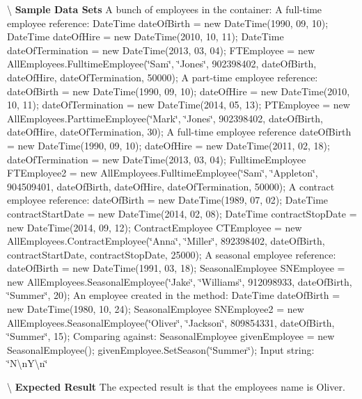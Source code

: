 \textbackslash{} {\bfseries  Sample Data Sets} A bunch of employees in the container\+: A full-\/time employee reference\+: Date\+Time date\+Of\+Birth = new Date\+Time(1990, 09, 10); Date\+Time date\+Of\+Hire = new Date\+Time(2010, 10, 11); Date\+Time date\+Of\+Termination = new Date\+Time(2013, 03, 04); F\+T\+Employee = new All\+Employees.\+Fulltime\+Employee(\char`\"{}\+Sam\char`\"{}, \char`\"{}\+Jones\char`\"{}, 902398402, date\+Of\+Birth, date\+Of\+Hire, date\+Of\+Termination, 50000); A part-\/time employee reference\+: date\+Of\+Birth = new Date\+Time(1990, 09, 10); date\+Of\+Hire = new Date\+Time(2010, 10, 11); date\+Of\+Termination = new Date\+Time(2014, 05, 13); P\+T\+Employee = new All\+Employees.\+Parttime\+Employee(\char`\"{}\+Mark\char`\"{}, \char`\"{}\+Jones\char`\"{}, 902398402, date\+Of\+Birth, date\+Of\+Hire, date\+Of\+Termination, 30); A full-\/time employee reference date\+Of\+Birth = new Date\+Time(1990, 09, 10); date\+Of\+Hire = new Date\+Time(2011, 02, 18); date\+Of\+Termination = new Date\+Time(2013, 03, 04); Fulltime\+Employee F\+T\+Employee2 = new All\+Employees.\+Fulltime\+Employee(\char`\"{}\+Sam\char`\"{}, \char`\"{}\+Appleton\char`\"{}, 904509401, date\+Of\+Birth, date\+Of\+Hire, date\+Of\+Termination, 50000); A contract employee reference\+: date\+Of\+Birth = new Date\+Time(1989, 07, 02); Date\+Time contract\+Start\+Date = new Date\+Time(2014, 02, 08); Date\+Time contract\+Stop\+Date = new Date\+Time(2014, 09, 12); Contract\+Employee C\+T\+Employee = new All\+Employees.\+Contract\+Employee(\char`\"{}\+Anna\char`\"{}, \char`\"{}\+Miller\char`\"{}, 892398402, date\+Of\+Birth, contract\+Start\+Date, contract\+Stop\+Date, 25000); A seasonal employee reference\+: date\+Of\+Birth = new Date\+Time(1991, 03, 18); Seasonal\+Employee S\+N\+Employee = new All\+Employees.\+Seasonal\+Employee(\char`\"{}\+Jake\char`\"{}, \char`\"{}\+Williams\char`\"{}, 912098933, date\+Of\+Birth, \char`\"{}\+Summer\char`\"{}, 20); An employee created in the method\+: Date\+Time date\+Of\+Birth = new Date\+Time(1980, 10, 24); Seasonal\+Employee S\+N\+Employee2 = new All\+Employees.\+Seasonal\+Employee(\char`\"{}\+Oliver\char`\"{}, \char`\"{}\+Jackson\char`\"{}, 809854331, date\+Of\+Birth, \char`\"{}\+Summer\char`\"{}, 15); Comparing against\+: Seasonal\+Employee given\+Employee = new Seasonal\+Employee(); given\+Employee.\+Set\+Season(\char`\"{}\+Summer\char`\"{}); Input string\+: \char`\"{}\+N\textbackslash{}n\+Y\textbackslash{}n\char`\"{}

\textbackslash{} {\bfseries  Expected Result} The expected result is that the employee\textquotesingle{}s name is Oliver.

